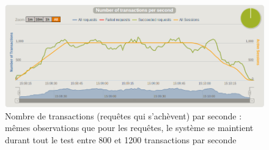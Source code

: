 \begin{figure}[h!]
	\centering
		\includegraphics[scale=0.5]{transactions.png}
	\caption{Nombre de transactions (requêtes qui s'achèvent) par seconde : mêmes observations que pour les requêtes, le système se maintient durant tout le test entre 800 et 1200 transactions par seconde}
\end{figure}